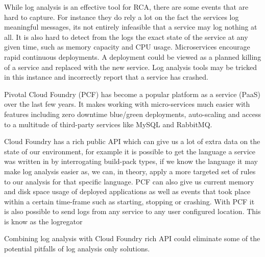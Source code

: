 While log analysis is an effective tool for RCA, there are some events that are hard to capture. For instance they do rely a lot on the fact the services log meaningful messages, its not entirely infeasible that a service may log nothing at all. It is also hard to detect from the logs the exact state of the service at any given time, such as memory capacity and CPU usage. Microservices encourage rapid continuous deployments\cite{villamizar2015evaluating}. A deployment could be viewed as a planned killing of a service and replaced with the new service. Log analysis tools may be tricked in this instance and incorrectly report that a service has crashed. 

Pivotal Cloud Foundry\cite{6924673} (PCF) has become a popular platform as a service (PaaS) over the last few years. It makes working with micro-services much easier with features including zero downtime blue/green deployments, auto-scaling and access to a multitude of third-party services like MySQL and RabbitMQ.

Cloud Foundry has a rich public API which can give us a lot of extra data on the state of our environment, for example it is possible to get the language a service was written in by interrogating build-pack types, if we know the language it may make log analysis easier as, we can, in theory, apply a more targeted set of rules to our analysis for that specific language. PCF can also give us current memory and disk space usage of deployed applications as well as events that took place within a certain time-frame such as starting, stopping or crashing. With PCF it is also possible to send logs from any service to any user configured location. This is know as the logregator\cite{winn2017cloud}

Combining log analysis with Cloud Foundry rich API could eliminate some of the potential pitfalls of log analysis only solutions. 
